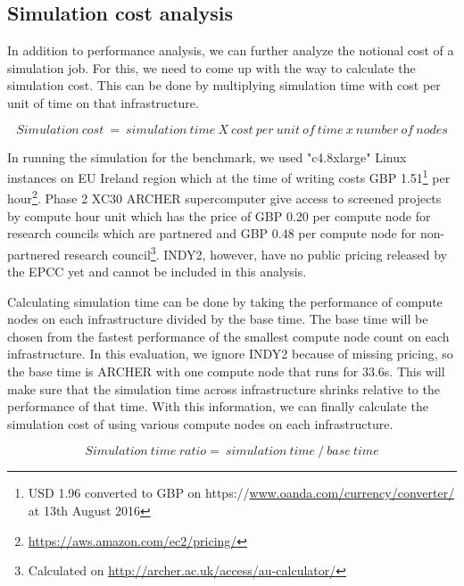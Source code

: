 \subsection{Simulation cost analysis}

In addition to performance analysis, we can further analyze the notional cost of a simulation job. For this, we need to come up with the way to calculate the simulation cost. This can be done by multiplying simulation time with cost per unit of time on that infrastructure.

\begin{displaymath}
 Simulation\ cost\ =\ simulation\ time\ X\ cost\ per\ unit\ of\ time\ x\ number\ of\ nodes
\end{displaymath}



In running the simulation for the benchmark, we used "c4.8xlarge" Linux instances on EU Ireland region which at the time of writing costs GBP 1.51\footnote{USD 1.96 converted to GBP on https://\url{www.oanda.com/currency/converter/} at 13th August 2016} per hour\footnote{\url{https://aws.amazon.com/ec2/pricing/}}. Phase 2 XC30 ARCHER supercomputer give access to screened projects by compute hour unit which has the price of GBP 0.20 per compute node for research councils which are partnered and GBP 0.48 per compute node for non-partnered research council\footnote{Calculated on \url{http://archer.ac.uk/access/au-calculator/}}. INDY2, however, have no public pricing released by the EPCC yet and cannot be included in this analysis. 


Calculating simulation time can be done by taking the performance of compute nodes on each infrastructure divided by the base time. The base time will be chosen from the fastest performance of the smallest compute node count on each infrastructure. In this evaluation, we ignore INDY2 because of missing pricing, so the base time is ARCHER with one compute node that runs for 33.6s. This will make sure that the simulation time across infrastructure shrinks relative to the performance of that time. With this information, we can finally calculate the simulation cost of using various compute nodes on each infrastructure.

\begin{displaymath}
 Simulation\ time\ ratio=\ simulation\ time\ /\ base\ time
\end{displaymath}

